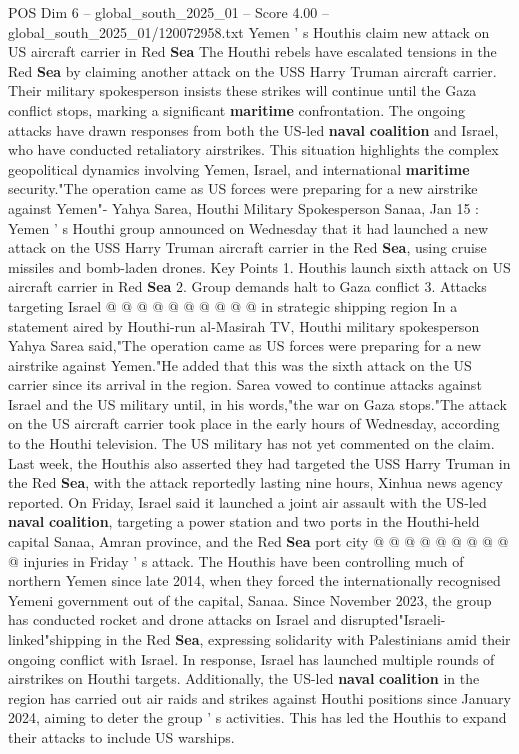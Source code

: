 \begin{textsample}{POS Dim 6 – global\_south\_2025\_01 – Score 4.00 – global\_south\_2025\_01/120072958.txt}  \label{ex:f6_pos_442}
Yemen ' s Houthis claim new attack on US aircraft carrier in Red \textbf{Sea} The Houthi rebels have escalated tensions in the Red \textbf{Sea} by claiming another attack on the USS Harry Truman aircraft carrier.
Their military spokesperson insists these strikes will continue until the Gaza conflict stops, marking a significant \textbf{maritime} confrontation.
The ongoing attacks have drawn responses from both the US-led \textbf{naval} \textbf{coalition} and Israel, who have conducted retaliatory airstrikes.
This situation highlights the complex geopolitical dynamics involving Yemen, Israel, and international \textbf{maritime} security."The operation came as US forces were preparing for a new airstrike against Yemen"- Yahya Sarea, Houthi Military Spokesperson Sanaa, Jan 15 : Yemen ' s Houthi group announced on Wednesday that it had launched a new attack on the USS Harry Truman aircraft carrier in the Red \textbf{Sea}, using cruise missiles and bomb-laden drones.
Key Points 1.
Houthis launch sixth attack on US aircraft carrier in Red \textbf{Sea} 2.
Group demands halt to Gaza conflict 3.
Attacks targeting Israel @ @ @ @ @ @ @ @ @ @ in strategic shipping region In a statement aired by Houthi-run al-Masirah TV, Houthi military spokesperson Yahya Sarea said,"The operation came as US forces were preparing for a new airstrike against Yemen."He added that this was the sixth attack on the US carrier since its arrival in the region.
Sarea vowed to continue attacks against Israel and the US military until, in his words,"the war on Gaza stops."The attack on the US aircraft carrier took place in the early hours of Wednesday, according to the Houthi television.
The US military has not yet commented on the claim.
Last week, the Houthis also asserted they had targeted the USS Harry Truman in the Red \textbf{Sea}, with the attack reportedly lasting nine hours, Xinhua news agency reported.
On Friday, Israel said it launched a joint air assault with the US-led \textbf{naval} \textbf{coalition}, targeting a power station and two ports in the Houthi-held capital Sanaa, Amran province, and the Red \textbf{Sea} port city @ @ @ @ @ @ @ @ @ @ injuries in Friday ' s attack.
The Houthis have been controlling much of northern Yemen since late 2014, when they forced the internationally recognised Yemeni government out of the capital, Sanaa.
Since November 2023, the group has conducted rocket and drone attacks on Israel and disrupted"Israeli-linked"shipping in the Red \textbf{Sea}, expressing solidarity with Palestinians amid their ongoing conflict with Israel.
In response, Israel has launched multiple rounds of airstrikes on Houthi targets.
Additionally, the US-led \textbf{naval} \textbf{coalition} in the region has carried out air raids and strikes against Houthi positions since January 2024, aiming to deter the group ' s activities.
This has led the Houthis to expand their attacks to include US warships.

\end{textsample}
